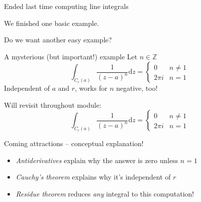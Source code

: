 \documentclass{beamer}
\newcommand{\Z}{\mathbb{Z}}
\begin{document}
\begin{frame}{Ended last time computing line integrals}

  We finished one basic example.

  \begin{block}{Do we want another easy example?}
    \end{block}
  

\begin{block}{A mysterious (but important!) example}
Let $n\in\Z$
$$\int_{C_r(a)}\frac{1}{(z-a)^n}\text{d}z=\begin{cases} 0 & n\neq 1 \\ 2\pi i & n=1\end{cases}$$
Independent of $a$ and $r$, works for $n$ negative, too!
\end{block}

\end{frame}

\begin{frame}{Will revisit throughout module:}
$$\int_{C_r(a)}\frac{1}{(z-a)^n}\text{d}z=\begin{cases} 0 & n\neq 1 \\ 2\pi i & n=1\end{cases}$$
\begin{block}{Coming attractions -- conceptual explanation!}
\begin{itemize}
    \item \emph{Antiderivatives} explain why the answer is zero unless $n=1$
    \item \emph{Cauchy's theorem} explains why it's independent of $r$
    \item \emph{Residue theorem} reduces \emph{any} integral to this computation!
\end{itemize}
\end{block}

\end{frame}
\end{document}
